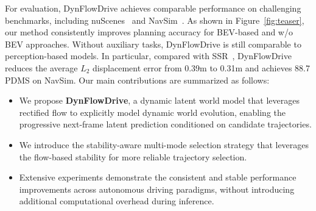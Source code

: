 For evaluation, DynFlowDrive achieves comparable performance on challenging benchmarks, including nuScenes~\cite{caesar2020nuscenes} and NavSim~\cite{dauner2024navsim}.
As shown in Figure~\ref{fig:teaser}, our method consistently improves planning accuracy for BEV-based and w/o BEV approaches. Without auxiliary tasks, DynFlowDrive is still comparable to perception-based models. In particular, compared with SSR~\cite{li2024ssr}, DynFlowDrive reduces the average $L_2$ displacement error from 0.39m to 0.31m and achieves 88.7 PDMS on NavSim.
Our main contributions are summarized as follows:
\vspace{-1mm}
\begin{itemize}
    \item We propose \textbf{DynFlowDrive}, a dynamic latent world model that leverages rectified flow to explicitly model dynamic world evolution, enabling the progressive next-frame latent prediction conditioned on candidate trajectories.
    \item We introduce the stability-aware multi-mode selection strategy that leverages the flow-based stability for more reliable trajectory selection.
    \item Extensive experiments demonstrate the consistent and stable performance improvements across autonomous driving paradigms, without introducing additional computational overhead during inference.
\end{itemize}

